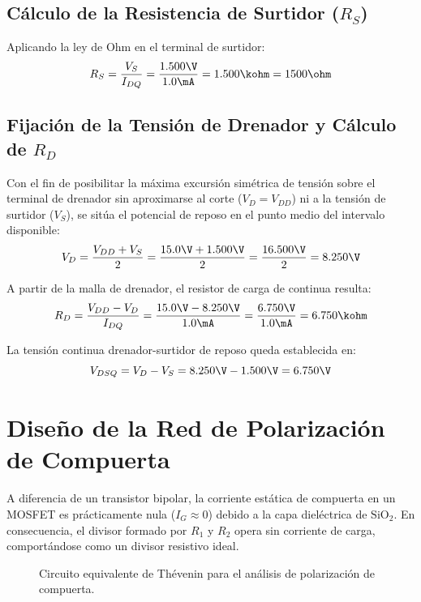 \subsection{Cálculo de la Resistencia de Surtidor (\texorpdfstring{$R_S$}{RS})}
Aplicando la ley de Ohm en el terminal de surtidor:
\begin{equation}
  R_S = \frac{V_S}{I_{DQ}} = \frac{1.500\V}{1.0\mA} = 1.500\kohm = 1500\ohm
  \label{eq:RS_calculo}
\end{equation}

\subsection{Fijación de la Tensión de Drenador y Cálculo de \texorpdfstring{$R_D$}{RD}}
Con el fin de posibilitar la máxima excursión simétrica de tensión sobre el terminal de drenador sin aproximarse al corte
($V_D = V_{DD}$) ni a la tensión de surtidor ($V_S$), se sitúa el potencial de reposo en el punto medio del intervalo
disponible:
\begin{equation}
  V_D = \frac{V_{DD} + V_S}{2} = \frac{15.0\V + 1.500\V}{2} = \frac{16.500\V}{2} = 8.250\V
  \label{eq:VD_calculo}
\end{equation}

A partir de la malla de drenador, el resistor de carga de continua resulta:
\begin{equation}
  R_D = \frac{V_{DD} - V_D}{I_{DQ}} = \frac{15.0\V - 8.250\V}{1.0\mA} = \frac{6.750\V}{1.0\mA} = 6.750\kohm
  \label{eq:RD_calculo}
\end{equation}

La tensión continua drenador-surtidor de reposo queda establecida en:
\begin{equation}
  V_{DSQ} = V_D - V_S = 8.250\V - 1.500\V = 6.750\V
  \label{eq:VDSQ_calculo}
\end{equation}

\section{Diseño de la Red de Polarización de Compuerta}

A diferencia de un transistor bipolar, la corriente estática de compuerta en un MOSFET es prácticamente nula
($I_G \approx 0$) debido a la capa dieléctrica de $\mathrm{SiO}_2$. En consecuencia, el divisor formado por $R_1$ y
$R_2$ opera sin corriente de carga, comportándose como un divisor resistivo ideal.

\begin{figure}[!ht]
  \centering
  
  \caption{Circuito equivalente de Thévenin para el análisis de polarización de compuerta.}
  \label{crkt:thevenin}
\end{figure}

